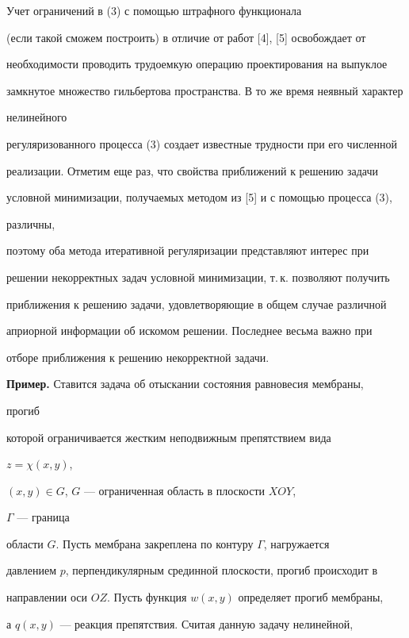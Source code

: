 \begin{note}


Учет ограничений в (3) с помощью штрафного функционала


(если такой сможем построить) в отличие от работ [4], [5] освобождает от


необходимости проводить трудоемкую операцию проектирования на выпуклое


замкнутое множество гильбертова пространства. В то же время неявный характер


нелинейного


регуляризованного процесса (3) создает известные трудности при его численной


реализации. Отметим еще раз, что свойства приближений к решению задачи


условной минимизации, получаемых методом из [5] и с помощью процесса (3),


различны,


поэтому оба метода итеративной регуляризации представляют интерес при


решении некорректных задач условной минимизации, т.\,к. позволяют получить


приближения к решению задачи, удовлетворяющие в общем случае различной


априорной информации об искомом решении. Последнее весьма важно при


отборе приближения к решению некорректной задачи.


\end{note}





{\bf Пример.} Ставится задача об отыскании состояния равновесия мембраны,


прогиб


которой ограничивается жестким неподвижным препятствием вида


$z=\chi(x,y)$,


$(x,y) \in G$, $G$ --- ограниченная область в плоскости $XOY$,


$\Gamma$ --- граница


области $G$. Пусть мембрана закреплена по контуру $\Gamma$, нагружается


давлением $p$, перпендикулярным срединной плоскости, прогиб происходит в


направлении оси $OZ$. Пусть функция $w(x,y)$ определяет прогиб мембраны,


а $q(x,y)$ --- реакция препятствия. Считая данную задачу нелинейной,


